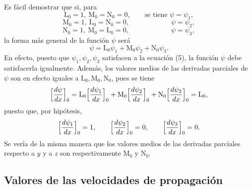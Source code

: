 Es fácil demostrar que si, para
\[
\mathrm L_0=1,\ \mathrm M_0=\mathrm N_0=0,\qquad\text{se tiene }\psi=\psi_1,
\]
\[
\mathrm M_0=1,\ \mathrm L_0=\mathrm N_0=0,\qquad\qquad\qquad \psi=\psi_2,
\]
\[
\mathrm N_0=1,\ \mathrm M_0=\mathrm L_0=0,\qquad\qquad\qquad \psi=\psi_3,
\]
la forma más general de la función $\psi$ será
\[
\psi=\mathrm L_0\psi_1+\mathrm M_0\psi_2+\mathrm N_0\psi_3.
\]
En efecto, puesto que $\psi_1,\psi_2,\psi_3$ satisfacen a la ecuación (5),
la función $\psi$ debe satisfacerla igualmente. Además, los valores medios
de las derivadas parciales de $\psi$ son en efecto iguales a $\mathrm
L_0,\mathrm M_0,\mathrm N_0$, pues se tiene
\[
\Bigl[\frac{d\psi}{dx}\Bigr]_0=\mathrm L_0\Bigl[\frac{d\psi_1}{dx}\Bigr]_0+\mathrm M_0\Bigl[\frac{d\psi_2}{dx}\Bigr]_0+\mathrm N_0\Bigl[\frac{d\psi_3}{dx}\Bigr]_0=\mathrm L_0,
\]
puesto que, por hipótesis,
\[
\Bigl[\frac{d\psi_1}{dx}\Bigr]_0=1,\qquad \Bigl[\frac{d\psi_2}{dx}\Bigr]_0=0,\qquad \Bigl[\frac{d\psi_3}{dx}\Bigr]_0=0.
\]
Se vería de la misma manera que los valores medios de las derivadas
parciales respecto a $y$ y a $z$ son respectivamente $\mathrm M_0$ y
$\mathrm N_0$.

\subsection{Valores de las velocidades de propagación}

